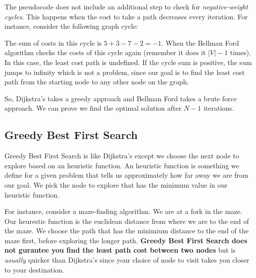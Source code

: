 \documentclass{tufte-handout}
\begin{document}
The pseudocode does not include an additional step to check for
\textit{negative-weight cycles}. This happens when the cost to take a
path decreases every iteration. For instance, consider the following
graph cycle:


The sum of costs in this cycle is $5+3-7-2=-1$. When the Bellman Ford
algorithm checks the costs of this cycle again (remember it does it
$|V|-1$ times). In this case, the least cost path is undefined. If the
cycle sum is positive, the sum jumps to infinity which is not a
problem, since our goal is to find the least cost path from the
starting node to any other node on the graph. 

So, Dijkstra's takes a greedy approach and Bellman Ford takes a brute
force approach. We can prove we find the optimal solution after $N-1$ iterations.

\subsection{Greedy Best First Search}
Greedy Best First Search is like Dijkstra's except we choose the next
node to explore based on an heuristic function. An heuristic function is something we define for a given
problem that tells us approximately how far away we are from our
goal. We pick the node to explore that has the minimum value in our
heuristic function.

For instance, consider a maze-finding
algorithm. We are at a fork in the maze. Our heurestic function is the
euclidean distance from where we are to the end of the maze. We choose
the path that has the minimium distance to the end of the maze first,
before exploring the longer path. \textbf{Greedy Best First Search
  does not gurantee you find the least path cost between two nodes}
but is \textit{usually} quicker than Dijkstra's since your choice of
node to visit takes you closer to your destination.   
\end{document}
